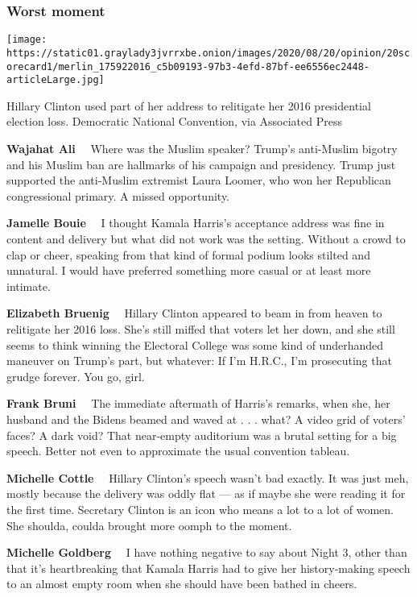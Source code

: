 \hypertarget{worst-moment}{%
\subsubsection{Worst moment}\label{worst-moment}}

\texttt{[image: https://static01.graylady3jvrrxbe.onion/images/2020/08/20/opinion/20scorecard1/merlin\_175922016\_c5b09193-97b3-4efd-87bf-ee6556ec2448-articleLarge.jpg]}

Hillary Clinton used part of her address to relitigate her 2016
presidential election loss. Democratic National Convention, via
Associated Press

\textbf{Wajahat Ali}~~ Where was the Muslim speaker? Trump's anti-Muslim
bigotry and his Muslim ban are hallmarks of his campaign and presidency.
Trump just supported the anti-Muslim extremist Laura Loomer, who won her
Republican congressional primary. A missed opportunity.

\textbf{Jamelle Bouie}~~ I thought Kamala Harris's acceptance address
was fine in content and delivery but what did not work was the setting.
Without a crowd to clap or cheer, speaking from that kind of formal
podium looks stilted and unnatural. I would have preferred something
more casual or at least more intimate.

\textbf{Elizabeth Bruenig}~~ Hillary Clinton appeared to beam in from
heaven to relitigate her 2016 loss. She's still miffed that voters let
her down, and she still seems to think winning the Electoral College was
some kind of underhanded maneuver on Trump's part, but whatever: If I'm
H.R.C., I'm prosecuting that grudge forever. You go, girl.

\textbf{Frank Bruni}~~ The immediate aftermath of Harris's remarks, when
she, her husband and the Bidens beamed and waved at . . . what? A video
grid of voters' faces? A dark void? That near-empty auditorium was a
brutal setting for a big speech. Better not even to approximate the
usual convention tableau.

\textbf{Michelle Cottle}~~ Hillary Clinton's speech wasn't bad exactly.
It was just meh, mostly because the delivery was oddly flat --- as if
maybe she were reading it for the first time. Secretary Clinton is an
icon who means a lot to a lot of women. She shoulda, coulda brought more
oomph to the moment.

\textbf{Michelle Goldberg}~~ I have nothing negative to say about Night
3, other than that it's heartbreaking that Kamala Harris had to give her
history-making speech to an almost empty room when she should have been
bathed in cheers.

